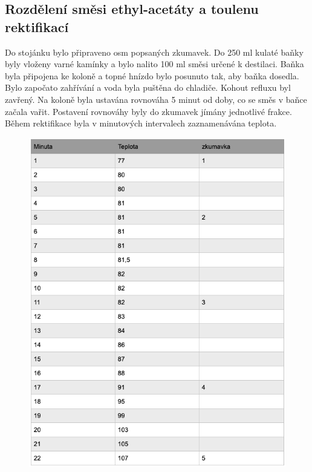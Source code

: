 \documentclass[13pt, a4paper, twoside]{article}z
\begin{document}
\subsection*{Rozdělení směsi ethyl-acetáty a toulenu rektifikací}
Do stojánku bylo připraveno osm popsaných zkumavek. Do 250 ml kulaté baňky byly vloženy varné kamínky a bylo nalito 100 ml směsi určené k destilaci. Baňka byla připojena ke koloně a topné hnízdo bylo posunuto tak, aby baňka dosedla. Bylo započato zahřívání a voda byla puštěna do chladiče. Kohout refluxu byl zavřený. Na koloně byla ustavána rovnováha 5 minut od doby, co se směs v baňce začala vařit. Postavení rovnováhy byly do zkumavek jímány jednotlivé frakce. Během rektifikace byla v minutových intervalech zaznamenávána teplota.
\begin{figure}[H]
    \centering
    \includegraphics[width=6.5in]{uloha_8_tab_1.png}
\end{figure}
\newpage
\end{document}
